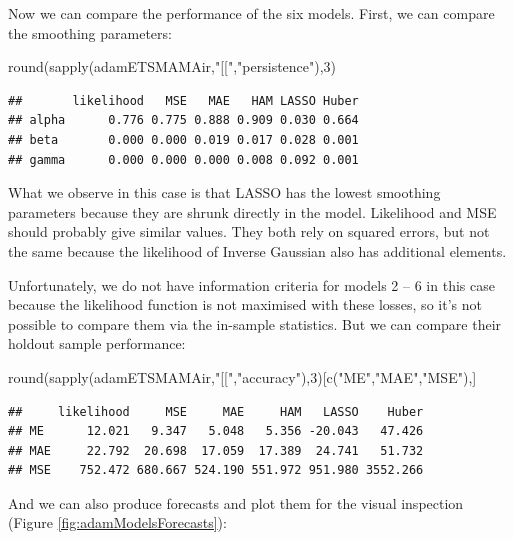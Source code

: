 \documentclass[
]{book}
\newenvironment{Shaded}{\begin{snugshade}}{\end{snugshade}}
\newcommand{\DecValTok}[1]{\textcolor[rgb]{0.00,0.00,0.81}{#1}}
\newcommand{\FunctionTok}[1]{\textcolor[rgb]{0.00,0.00,0.00}{#1}}
\newcommand{\NormalTok}[1]{#1}
\newcommand{\StringTok}[1]{\textcolor[rgb]{0.31,0.60,0.02}{#1}}
\theoremstyle{definition}
\theoremstyle{definition}
\theoremstyle{definition}
\theoremstyle{definition}
\theoremstyle{remark}
\begin{document}
Now we can compare the performance of the six models. First, we can compare the smoothing parameters:

\begin{Shaded}
\begin{Highlighting}[]
\FunctionTok{round}\NormalTok{(}\FunctionTok{sapply}\NormalTok{(adamETSMAMAir,}\StringTok{"[["}\NormalTok{,}\StringTok{"persistence"}\NormalTok{),}\DecValTok{3}\NormalTok{)}
\end{Highlighting}
\end{Shaded}

\begin{verbatim}
##       likelihood   MSE   MAE   HAM LASSO Huber
## alpha      0.776 0.775 0.888 0.909 0.030 0.664
## beta       0.000 0.000 0.019 0.017 0.028 0.001
## gamma      0.000 0.000 0.000 0.008 0.092 0.001
\end{verbatim}

What we observe in this case is that LASSO has the lowest smoothing parameters because they are shrunk directly in the model. Likelihood and MSE should probably give similar values. They both rely on squared errors, but not the same because the likelihood of Inverse Gaussian also has additional elements.

Unfortunately, we do not have information criteria for models 2 -- 6 in this case because the likelihood function is not maximised with these losses, so it's not possible to compare them via the in-sample statistics. But we can compare their holdout sample performance:

\begin{Shaded}
\begin{Highlighting}[]
\FunctionTok{round}\NormalTok{(}\FunctionTok{sapply}\NormalTok{(adamETSMAMAir,}\StringTok{"[["}\NormalTok{,}\StringTok{"accuracy"}\NormalTok{),}\DecValTok{3}\NormalTok{)[}\FunctionTok{c}\NormalTok{(}\StringTok{"ME"}\NormalTok{,}\StringTok{"MAE"}\NormalTok{,}\StringTok{"MSE"}\NormalTok{),]}
\end{Highlighting}
\end{Shaded}

\begin{verbatim}
##     likelihood     MSE     MAE     HAM   LASSO    Huber
## ME      12.021   9.347   5.048   5.356 -20.043   47.426
## MAE     22.792  20.698  17.059  17.389  24.741   51.732
## MSE    752.472 680.667 524.190 551.972 951.980 3552.266
\end{verbatim}

And we can also produce forecasts and plot them for the visual inspection (Figure \ref{fig:adamModelsForecasts}):
\end{document}
